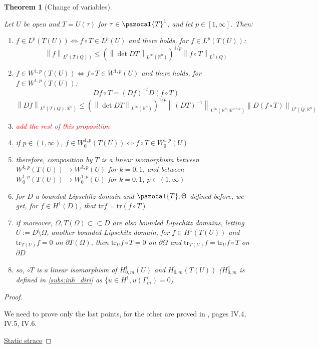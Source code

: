 \documentclass[english,a4paper,9pt,oneside]{scrbook}	%
\theoremstyle{break}
\newtheorem{thm}[equation]{Theorem}
\newenvironment{mproof}[1][\proofname]{%
  \begin{proof}[#1]$ $\par\nobreak\ignorespaces
}{%
  \end{proof}
}
\renewcommand*{\proofname}{Proof}
\theoremstyle{remark}
\newcommand{\mR}{\mathbb{R}}
\newcommand{\norm}[1]{\left\lVert#1\right\rVert}
\newcommand{\tr}{\text{tr}}
\newcommand{\cc}{\subset\subset}
\newcommand{\cT}{\pazocal{T}}
\newcommand{\Te}{\Theta}
\newcommand{\tred}[1]{\textcolor{red}{#1}}
\begin{document}
\begin{appendices}
\begin{thm}[Change of variables]
\label{thm:change}

Let $U$ be open and $T = U(\tau)$ for $\tau \in \cT^1$, and let $p \in [ 1,\infty]$. Then:

\begin{enumerate}
	\item $f \in L^p(T(U)) \iff f\circ T \in L^p(U)$ and there holds, for $f \in L^p(T(U))$:
	$$ \norm{f}_{L^p(T(Q))}\leq \left ( \norm{\det DT}_{L^\infty(\mR^n)}\right)^{1/p} \norm{f\circ T}_{L^p(Q)}$$
	\item $f \in W^{1,p}(T(U)) \iff f\circ T \in W^{1,p}(U)$ and there holds, for $f\in W^{1,p}(T(U))$:
	$$Df \circ T = (Df)^{-t}D(f\circ T)$$
	$$ \norm{Df}_{L^p(T(Q);\mR^n)}\leq \left ( \norm{\det DT}_{L^\infty(\mR^n)}\right)^{1/p} \norm{(DT)^{-1}}_{L^\infty(\mR^n;\mR^{n\times n})}\norm{D(f\circ T)}_{L^p(Q;\mR^n)}$$
	\item \tred{add the rest of this proposition}
	\item if $p \in (1, \infty)$, $f \in W^{1,p}_0(T(U)) \iff f\circ T \in W^{1,p}_0(U)$
	\item therefore, composition by $T$ is a linear isomorphism between $W^{k,p}(T(U))\rightarrow W^{k,p}(U)$ for $k=0,1$, and between $W^{1,p}_0(T(U))\rightarrow W^{1,p}_0(U)$ for $k=0,1$, $p \in (1, \infty)$
	\item for $D$ a bounded Lipschitz domain and $\cT, \Te$ defined before, we get, for $f \in H^1(D)$, that $\tr f = \tr(f\circ T)$
	\item if moreover, $\Omega, T(\Omega) \cc D$ are also bounded Lipschitz domains, letting $U:=D\setminus \Omega$, another bounded Lipschitz domain, for $f \in H^1(T(U))$ and $\tr_{T(U)} f =0 $ on $ \partial T(\Omega) $, then $\tr_{U} f\circ T=0$ on $\partial \Omega$ and $\tr_{T(U)} f = \tr_{U} f\circ T$ on $\partial D$
	\item so, $\circ T$ is a linear isomorphism of $H^1_{0,m}(U)$ and $H^1_{0,m}(T(U))$ ($H^1_{0,m}$ is defined in \cref{subs:inh_diri} as $\{u \in H^1, u(\Gamma_m)=0$)
\end{enumerate}

\end{thm}

\begin{mproof}

We need to prove only the last points, for the other are proved in \cite{murat}, pages IV.4, IV.5, IV.6.

\underline{Static strace}


\end{mproof}
\end{appendices}
\end{document}

